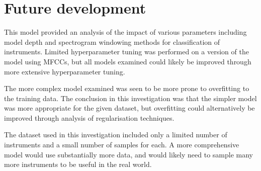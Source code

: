 \documentclass[class=report,11pt,crop=false]{standalone}
\begin{document}
\ifstandalone
\tableofcontents
\fi
\section{Future development \label{ch:recommendations}}

This model provided an analysis of the impact of various parameters including model depth and spectrogram windowing methods for classification of instruments. Limited hyperparameter tuning was performed on a version of the model using MFCCs, but all models examined could likely be improved through more extensive hyperparameter tuning.

The more complex model examined was seen to be more prone to overfitting to the training data. The conclusion in this investigation was that the simpler model was more appropriate for the given dataset, but overfitting could alternatively be improved through analysis of regularisation techniques.

The dataset used in this investigation included only a limited number of instruments and a small number of samples for each. A more comprehensive model would use substantially more data, and would likely need to sample many more instruments to be useful in the real world.


\ifstandalone

\printnoidxglossary[type=\acronymtype,nonumberlist]
\fi
\end{document}
